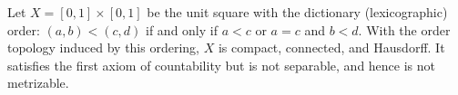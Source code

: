 Let $X = [0,1] \times [0,1]$ be the unit square with the dictionary (lexicographic) order: $(a,b) < (c,d)$ if and only if $a < c$ or $a = c$ and $b < d$. With the order topology induced by this ordering, $X$ is compact, connected, and Hausdorff. It satisfies the first axiom of countability but is not separable, and hence is not metrizable.
